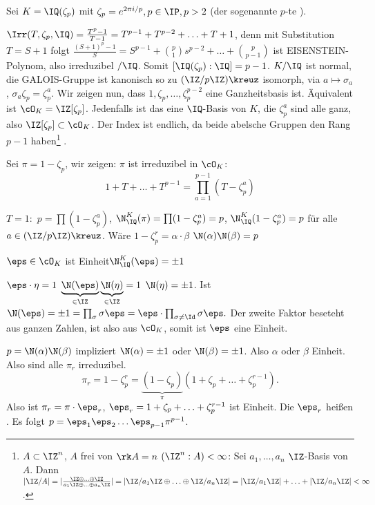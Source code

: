 \begin{Beispiel}
 Sei $K=\IQ(\zeta_p)$ mit $\zeta_p=e^{2\pi i/p}, p\in \IP, p>2$ (der sogenannte $p$-te ).
 
 $\Irr(T,\zeta_p,\IQ)=\frac{T^p-1}{T-1}=T^{p-1}+T^{p-2}+\ldots+T+1$, denn mit Substitution $T=S+1$ folgt $\frac{(S+1)^p-1}{S}=S^{p-1}+\binom{p}{1}s^{p-2}+\ldots+\binom{p}{p-1}$ ist EISENSTEIN-Polynom, also irreduzibel $/\IQ$. Somit $[\IQ(\zeta_p):\IQ]=p-1$. $K/\IQ$ ist normal, die GALOIS-Gruppe ist kanonisch so 
 zu $(\IZ/p\IZ)\kreuz$ isomorph, via $a\mapsto \sigma_a$, $\sigma_a\zeta_p=\zeta_p^a$. Wir zeigen nun, dass $1,\zeta_p,\ldots,\zeta_p^{p-2}$ eine Ganzheitsbasis ist. Äquivalent ist $\cO_K=\IZ[\zeta_p]$.
 Jedenfalls ist das eine $\IQ$-Basis von $K$, die $\zeta_p^a$ sind alle ganz, also $\IZ[\zeta_p]\subset \cO_K$. Der Index ist endlich, da beide abelsche Gruppen den Rang $p-1$ haben\footnote{$A\subset \IZ^n$, $A$ frei von $\rk A=n$ \folge $(\IZ^n:A)<\infty$: Sei $a_1,\ldots,a_n$ $\IZ$-Basis von $A$. Dann $|\IZ/A|=|\frac{\IZ\oplus\ldots\oplus\IZ}{a_1\IZ\oplus\ldots\oplus a_n\IZ}|=|\IZ/a_1\IZ\oplus\ldots\oplus\IZ/a_n\IZ|=|\IZ/a_1\IZ|+\ldots+|\IZ/a_n\IZ|<\infty$.}  .
 
 Sei $\pi=1-\zeta_p$, wir zeigen: $\pi$ ist irreduzibel in $\cO_K$:
 \[ 1+T+\ldots + T^{p-1}=\prod_{a=1}^{p-1} (T-\zeta_p^a)\]
 
 $T=1:$ $p=\prod (1-\zeta_p^a)$, $\N_\IQ^K(\pi)=\prod(1-\zeta_p^a)=p$, $\N_\IQ^K(1-\zeta_p^a)=p$ für alle $a\in (\IZ/p\IZ)\kreuz$. Wäre $1-\zeta_p^r=\alpha\cdot \beta$ \folge $\N(\alpha) \N(\beta)=p$
\end{Beispiel}

\begin{Lemma}
 $\eps\in \cO_K$ ist Einheit\gdw $\N_\IQ^K(\eps)=\pm 1$
\end{Lemma}

\begin{Beweis}
$\eps\cdot \eta = 1$ \folge $\underbrace{\N(\eps)}_{\in\IZ} \underbrace{\N(\eta)}_{\in\IZ}=1$ \folge $\N(\eta)=\pm 1$.
 Ist $\N(\eps)=\pm 1= \prod_\sigma \sigma\eps = \eps \cdot \prod_{\sigma\neq \Id} \sigma\eps.$ Der zweite Faktor beseteht aus ganzen Zahlen, ist also aus $\cO_K$, somit ist $\eps$ eine Einheit.
\end{Beweis}

 $p=\N(\alpha)\N(\beta)$ impliziert $\N(\alpha)=\pm 1$ oder $\N(\beta)=\pm 1$. Also $\alpha$ oder $\beta$ Einheit. Also sind alle $\pi_r$ irreduzibel.
 \[ \pi_r=1-\zeta_p^r=\underbrace{(1-\zeta_p)}_\pi(1+\zeta_p + \ldots + \zeta_p^{r-1}).\]
 Also ist $\pi_r=\pi\cdot \eps_r$, $\eps_r=1+\zeta_p + \ldots + \zeta_p^{r-1}$ ist Einheit. Die $\eps_r$ heißen .
 Es folgt $p=\eps_1\eps_2\ldots \eps_{p-1} \pi^{p-1}$.


